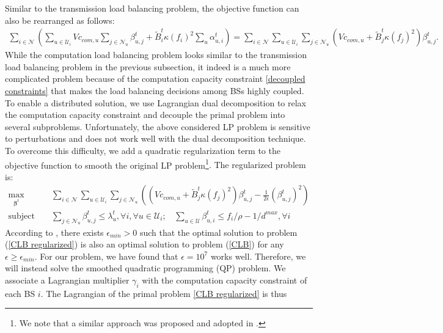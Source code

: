 \documentclass[12pt, draftclsnofoot, letterpaper, onecolumn]{IEEEtran}
\begin{document}
Similar to the transmission load balancing problem, the objective function can also be rearranged as follows:
\begin{align*}
\sum_{i\in\mathcal{N}}\left(\sum_{u\in\mathcal{U}_i}Vc_{com,u}\sum_{j\in\mathcal{N}_u}\beta^t_{u,j} + \tilde{B}^t_i \kappa (f_i)^2\sum_u \alpha^t_{u,i} \right)
= \sum_{i\in\mathcal{N}}\sum_{u\in\mathcal{U}_i}\sum_{j\in\mathcal{N}_u}(Vc_{com,u} +\tilde{B}^t_j\kappa(f_j)^2)\beta^t_{u,j}.
\end{align*}
While the computation load balancing problem looks similar to the transmission load balancing problem in the previous subsection, it indeed is a much more complicated problem because of the computation capacity constraint \eqref{decoupled constraints} that makes the load balancing decisions among BSs highly coupled. To enable a distributed solution, we use Lagrangian dual decomposition to relax the computation capacity constraint and decouple the primal problem into several subproblems. Unfortunately, the above considered LP problem is sensitive to perturbations and does not work well with the dual decomposition technique. To overcome this difficulty, we add a quadratic regularization term to the objective function to smooth the original LP problem{\footnote{We note that a similar approach was proposed and adopted in \cite{yuan2013linearized}.}. The regularized problem is:
\begin{subequations}
	\begin{align}
	\max_{\bm\beta^t}&~~~\sum_{i\in\mathcal{N}}\sum_{u\in\mathcal{U}_i}\sum_{j\in\mathcal{N}_u}\left((Vc_{com,u} +\tilde{B}^t_j\kappa(f_j)^2)\beta^t_{u,j} - \frac{1}{2\epsilon}(\beta^t_{u,j})^2 \right) \label{CLB regularized}\\
	\text{subject to}&~~~\sum_{j\in\mathcal{N}_u}\beta^t_{u,j} \leq \lambda^t_{u}, \forall i, \forall u\in\mathcal{U}_i;~~~~\sum_{u\in\mathcal{U}}\beta^t_{u,i} \leq f_i/\rho - 1/d^{max}, \forall i
	\end{align}
\end{subequations}
According to \cite{friedlander2007exact}, there exists $\epsilon_{min} > 0$ such that the optimal solution to problem (\ref{CLB regularized}) is also an optimal solution to problem (\ref{CLB}) for any $\epsilon \geq \epsilon_{min}$. For our problem, we have  found that $\epsilon = 10^7$ works well. Therefore, we will instead solve the smoothed quadratic programming (QP) problem. We associate a Lagrangian multiplier $\gamma_i$ with the computation capacity constraint of each BS $i$. The Lagrangian of the primal problem \eqref{CLB regularized} is thus
}
\end{document}
